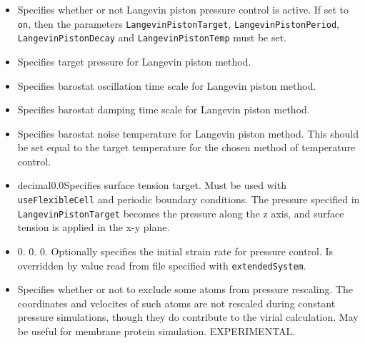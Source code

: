 \begin{itemize}

\item
{}
{Specifies whether or not Langevin piston pressure control is active.  
If set to {\tt on}, then the parameters {\tt LangevinPistonTarget}, {\tt LangevinPistonPeriod}, {\tt LangevinPistonDecay} and {\tt LangevinPistonTemp} must be set.}

\item
{}
{Specifies target pressure for Langevin piston method.}

\item
{}
{Specifies barostat oscillation time scale for Langevin piston method.}

\item
{}
{Specifies barostat damping time scale for Langevin piston method.}

\item
{}
{Specifies barostat noise temperature for Langevin piston method.
This should be set equal to the target temperature for the chosen method of temperature control.}

\item
{}
{decimal}{0.0}{Specifies surface tension target.  Must be used with 
{\tt useFlexibleCell} and periodic boundary conditions.  The pressure 
specified in {\tt LangevinPistonTarget} becomes the pressure along the z
axis, and surface tension is applied in the x-y plane.}

\item
{}
{0. 0. 0.}
{Optionally specifies the initial strain rate for pressure control.
Is overridden by value read from file specified with {\tt extendedSystem}.}

\item
{}
{Specifies whether or not to exclude some atoms from pressure rescaling.  The
coordinates and velocites of such atoms are not rescaled during constant
pressure simulations, though they do contribute to the virial calculation. 
May be useful for membrane protein simulation.  EXPERIMENTAL.}


\end{itemize}

